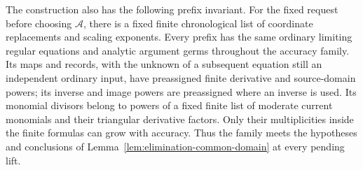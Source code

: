 \begin{proposition}
The construction also has the following prefix invariant.  For the
fixed request before choosing $\mathcal A$, there is a fixed finite
chronological list of coordinate replacements and scaling exponents.
Every prefix has the same ordinary limiting regular equations and
analytic argument germs throughout the accuracy family.  Its maps
and records, with the unknown of a subsequent equation still an
independent ordinary input, have preassigned finite derivative and
source-domain powers; its inverse and image powers are preassigned
where an inverse is used.  Its monomial divisors belong to powers
of a fixed finite list of moderate current monomials and their
triangular derivative factors.  Only their multiplicities inside
the finite formulas can grow with accuracy.  Thus the family meets
the hypotheses and conclusions of
Lemma~\ref{lem:elimination-common-domain} at every pending lift.
\end{proposition}

